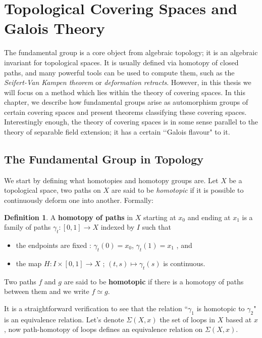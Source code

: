 \documentclass{article}
\theoremstyle{plain}
\theoremstyle{definition}
\newtheorem{definition}[theorem]{Definition}
\begin{document}
\newpage
\section{Topological Covering Spaces and Galois Theory}

The fundamental group is a core object from algebraic topology; it is an algebraic invariant for topological spaces. 
It is usually defined via homotopy of closed paths,
and many powerful tools can be used to compute them, such as the \textit{Seifert-Van Kampen theorem} or \textit{deformation retracts}.
However, in this thesis we will focus on a method which lies within the theory of covering spaces.
In this chapter, we describe how fundamental groups arise as automorphism groups of certain covering spaces and present theorems classifying these covering spaces.
Interestingly enough, the theory of covering spaces is in some sense parallel to the theory of separable field extension; it has a certain ‘‘Galois flavour" to it.\\


\subsection{The Fundamental Group in Topology}

\noindent We start by defining what homotopies and homotopy groups are.
Let $X$ be a topological space, two paths on $X$ are said to be \textit{homotopic} if it is possible to continuously deform one into another. 
Formally:
\begin{definition}
    A \textbf{homotopy of paths} in $X$ starting at $x_0$ and ending at $x_1$ is a family of paths $\gamma_t:[0,1]\rightarrow X$ indexed by $I$ such that 
    \begin{itemize}
        \item[$a)$] the endpoints are fixed : $\gamma_t(0) = x_0$,  $\gamma_t(1)=x_1$ , and 
        \item[$b)$] the map $H:I\times[0,1]\rightarrow X$ ; $(t,s)\mapsto \gamma_t(s)$ is continuous.
    \end{itemize}
    Two paths $f$ and $g$ are said to be \textbf{homotopic} if there is a homotopy of paths between them and we write $f\simeq g$.
\end{definition}

\noindent It is a straightforward verification to see that the relation ``$\gamma_1$ is homotopic to $\gamma_2$" is an equivalence relation.
Let's denote $\Sigma(X,x)$ the set of loops in $X$ based at $x$, now path-homotopy of loops defines an equivalence relation on $\Sigma(X,x)$.
\end{document}
